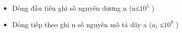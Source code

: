 \begin{itemize}
	\item     Dòng đầu tiên ghi số nguyên dương n (n≤$10^{5}$    )   
	\item     Dòng  tiếp theo ghi n số nguyên mô tả dãy a ($a_{i}$    ≤$10^{9}$    )   
\end{itemize}